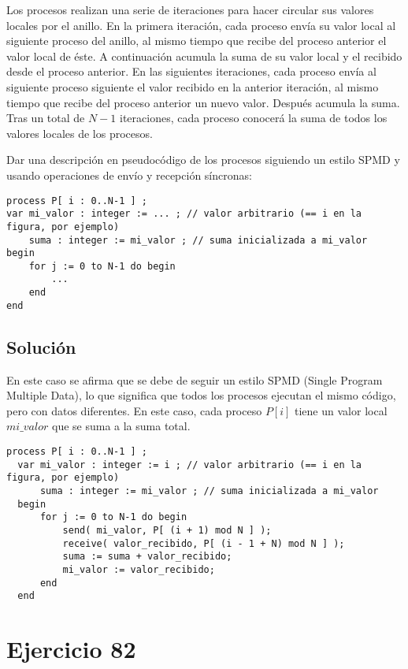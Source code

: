 \documentclass[a4paper,12pt]{article}
\begin{document}
Los procesos realizan una serie de iteraciones para hacer circular sus valores locales por el anillo. En la primera iteración, cada proceso envía su valor local al siguiente proceso del anillo, al mismo tiempo que recibe del proceso anterior el valor local de éste. A continuación acumula la suma de su valor local y el recibido desde el proceso anterior. En las siguientes iteraciones, cada proceso envía al siguiente proceso siguiente el valor recibido en la anterior iteración, al mismo tiempo que recibe del proceso anterior un nuevo valor. Después acumula la suma. Tras un total de $N - 1$ iteraciones, cada proceso conocerá la suma de todos los valores locales de los procesos.



Dar una descripción en pseudocódigo de los procesos siguiendo un estilo SPMD y usando operaciones de envío y recepción síncronas:

\begin{lstlisting}[style=customcpp]
process P[ i : 0..N-1 ] ;
var mi_valor : integer := ... ; // valor arbitrario (== i en la figura, por ejemplo)
    suma : integer := mi_valor ; // suma inicializada a mi_valor
begin
    for j := 0 to N-1 do begin
        ...
    end
end
\end{lstlisting}


\subsection{Solución}

En este caso se afirma que se debe de seguir un estilo SPMD (Single Program Multiple Data), lo que significa que todos los procesos ejecutan el mismo código, pero con datos diferentes. En este caso, cada proceso $P[i]$ tiene un valor local $mi\_valor$ que se suma a la suma total.

\begin{lstlisting}[style=customcpp]
  process P[ i : 0..N-1 ] ;
  var mi_valor : integer := i ; // valor arbitrario (== i en la figura, por ejemplo)
      suma : integer := mi_valor ; // suma inicializada a mi_valor
  begin
      for j := 0 to N-1 do begin
          send( mi_valor, P[ (i + 1) mod N ] );
          receive( valor_recibido, P[ (i - 1 + N) mod N ] );
          suma := suma + valor_recibido;
          mi_valor := valor_recibido; 
      end
  end
\end{lstlisting}

\section{Ejercicio 82}
\end{document}

